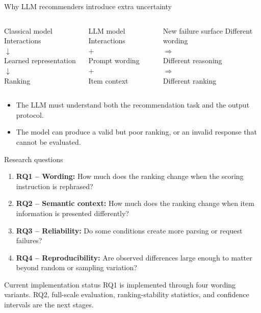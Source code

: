 \documentclass[aspectratio=169,12pt]{beamer}
\begin{document}
\begin{frame}{Why LLM recommenders introduce extra uncertainty}
\begin{columns}[T]
\begin{block}{Classical model}
\centering
Interactions\\
$\downarrow$\\
Learned representation\\
$\downarrow$\\
Ranking
\end{block}

\begin{block}{LLM model}
\centering
Interactions\\
$+$\\
Prompt wording\\
$+$\\
Item context
\end{block}

\begin{block}{New failure surface}
\centering
Different wording\\
$\Rightarrow$\\
Different reasoning\\
$\Rightarrow$\\
Different ranking
\end{block}
\end{columns}

\vspace{0.6em}
\begin{itemize}
  \item The LLM must understand both the recommendation task and the output
        protocol.
  \item The model can produce a valid but poor ranking, or an invalid response
        that cannot be evaluated.
\end{itemize}
\end{frame}

\begin{frame}{Research questions}
\begin{enumerate}
  \item \textbf{RQ1 -- Wording:} How much does the ranking change when the
        scoring instruction is rephrased?
  \item \textbf{RQ2 -- Semantic context:} How much does the ranking change when
        item information is presented differently?
  \item \textbf{RQ3 -- Reliability:} Do some conditions create more parsing or
        request failures?
  \item \textbf{RQ4 -- Reproducibility:} Are observed differences large enough
        to matter beyond random or sampling variation?
\end{enumerate}

\begin{exampleblock}{Current implementation status}
RQ1 is implemented through four wording variants. RQ2, full-scale evaluation,
ranking-stability statistics, and confidence intervals are the next stages.
\end{exampleblock}
\end{frame}
\end{document}

